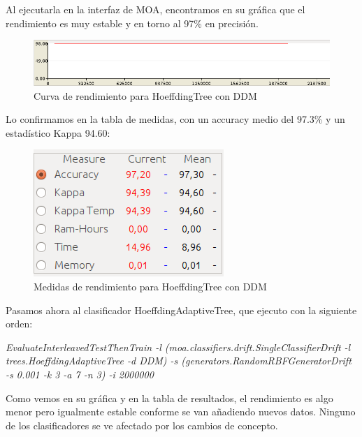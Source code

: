 Al ejecutarla en la interfaz de MOA, encontramos en su gráfica que el rendimiento es muy estable y en torno al 97\% en precisión.

\begin{figure}[H] %
	\centering
	\includegraphics[scale=0.5]{graph51.png}  %
	\caption{Curva de rendimiento para HoeffdingTree con DDM} 
	\label{fig:graph51}
\end{figure}

Lo confirmamos en la tabla de medidas, con un accuracy medio del 97.3\% y un estadístico Kappa 94.60:

\begin{figure}[H] %
	\centering
	\includegraphics[scale=0.5]{measures51.png}  %
	\caption{Medidas de rendimiento para HoeffdingTree con DDM} 
	\label{fig:measure51}
\end{figure}


Pasamos ahora al clasificador HoeffdingAdaptiveTree, que ejecuto con la siguiente orden:

\textit{EvaluateInterleavedTestThenTrain -l (moa.classifiers.drift.SingleClassifierDrift -l trees.HoeffdingAdaptiveTree -d DDM) -s (generators.RandomRBFGeneratorDrift -s 0.001 -k 3 -a 7 -n 3) -i 2000000}

Como vemos en su gráfica y en la tabla de resultados, el rendimiento es algo menor pero igualmente estable conforme se van  añadiendo nuevos datos. Ninguno de los clasificadores se ve afectado por los cambios de concepto.

